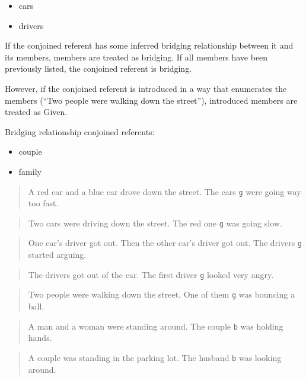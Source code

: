 \documentclass[
]{book}
\providecommand{\tightlist}{%
  \setlength{\itemsep}{0pt}\setlength{\parskip}{0pt}}
\begin{document}
\begin{itemize}
\tightlist
\item
  cars
\item
  drivers
\end{itemize}

If the conjoined referent has some inferred bridging relationship between it and its members, members are treated as bridging.
If all members have been previously listed, the conjoined referent is bridging.

However, if the conjoined referent is introduced in a way that enumerates the members (``Two people were walking down the street''),
introduced members are treated as Given.

Bridging relationship conjoined referents:

\begin{itemize}
\tightlist
\item
  couple
\item
  family
\end{itemize}

\begin{quote}
A red car and a blue car drove down the street.
The cars \texttt{g} were going way too fast.
\end{quote}

\begin{quote}
Two cars were driving down the street.
The red one \texttt{g} was going slow.
\end{quote}

\begin{quote}
One car's driver got out.
Then the other car's driver got out.
The drivers \texttt{g} started arguing.
\end{quote}

\begin{quote}
The drivers got out of the car.
The first driver \texttt{g} looked very angry.
\end{quote}

\begin{quote}
Two people were walking down the street.
One of them \texttt{g} was bouncing a ball.
\end{quote}

\begin{quote}
A man and a woman were standing around.
The couple \texttt{b} was holding hands.
\end{quote}

\begin{quote}
A couple was standing in the parking lot.
The husband \texttt{b} was looking around.
\end{quote}
\end{document}

